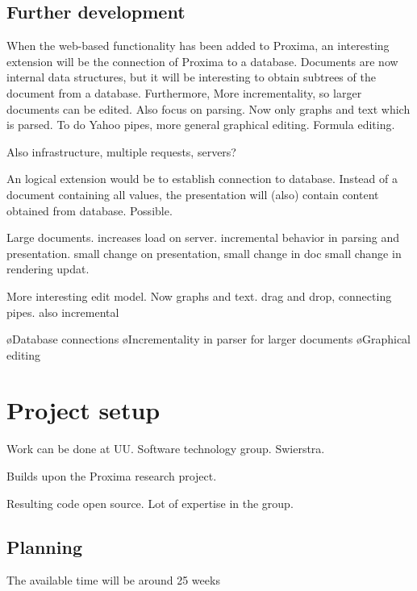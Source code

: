 \subsection{Further development}


When the web-based functionality has been added to Proxima, an interesting extension will be the connection of Proxima to a database. Documents are now internal data structures, but it will be interesting to obtain subtrees of the document from a database. Furthermore, More incrementality, so larger documents can be edited. Also focus on parsing. Now only graphs and text which is parsed. To do Yahoo pipes, more general graphical editing. Formula editing.

Also infrastructure, multiple requests, servers? 


An logical extension would be to establish connection to database. Instead of a document containing all values, the presentation will (also) contain content obtained from database. Possible.

Large documents. increases load on server. incremental behavior in parsing and presentation. small change on presentation, small change in doc small change in rendering updat.

More interesting edit model. Now graphs and text. drag and drop, connecting pipes. also incremental

\bl
\o Database connections
\o Incrementality in parser for larger documents
\o Graphical editing
\el

\section{Project setup}

Work can be done at UU. Software technology group. Swierstra.

Builds upon the Proxima research project.

Resulting code open source. Lot of expertise in the group.

\subsection{Planning}

The available time will be around 25 weeks

